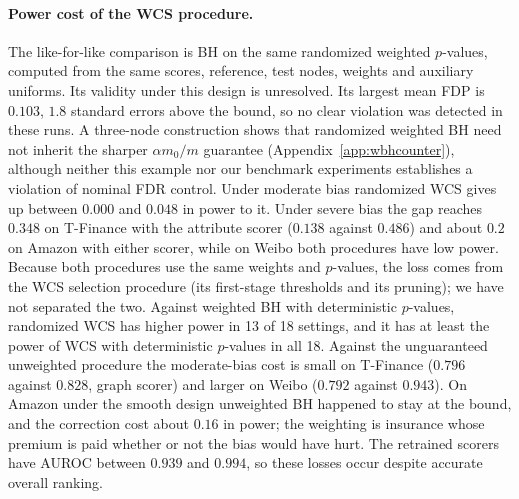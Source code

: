 \documentclass[twoside]{article}
\begin{document}
\paragraph{Power cost of the WCS procedure.}
The like-for-like comparison is BH on the same randomized weighted $p$-values, computed from the same scores, reference, test nodes, weights and auxiliary uniforms. Its validity under this design is unresolved. Its largest mean FDP is $0.103$, $1.8$ standard errors above the bound, so no clear violation was detected in these runs. A three-node construction shows that randomized weighted BH need not inherit the sharper $\alpha m_0/m$ guarantee (Appendix~\ref{app:wbhcounter}), although neither this example nor our benchmark experiments establishes a violation of nominal FDR control. Under moderate bias randomized WCS gives up between $0.000$ and $0.048$ in power to it. Under severe bias the gap reaches $0.348$ on T-Finance with the attribute scorer ($0.138$ against $0.486$) and about $0.2$ on Amazon with either scorer, while on Weibo both procedures have low power. Because both procedures use the same weights and $p$-values, the loss comes from the WCS selection procedure (its first-stage thresholds and its pruning); we have not separated the two. Against weighted BH with deterministic $p$-values, randomized WCS has higher power in 13 of 18 settings, and it has at least the power of WCS with deterministic $p$-values in all 18. Against the unguaranteed unweighted procedure the moderate-bias cost is small on T-Finance ($0.796$ against $0.828$, graph scorer) and larger on Weibo ($0.792$ against $0.943$). On Amazon under the smooth design unweighted BH happened to stay at the bound, and the correction cost about $0.16$ in power; the weighting is insurance whose premium is paid whether or not the bias would have hurt. The retrained scorers have AUROC between $0.939$ and $0.994$, so these losses occur despite accurate overall ranking.

\begin{table}[t]
\centering\small
\caption{Power of randomized WCS under each biased design $\to$ under uniform acquisition at approximately matched expected label budgets (graph-feature scorer; expected counts differ by at most $2.2$ labels). Every paired difference is positive with a seed-clustered 95\% interval above zero, for both scorers (Table~\ref{tab:uniform}).}
\label{tab:uniformmain}{\setlength{\tabcolsep}{3pt}}
\end{table}
\end{document}
